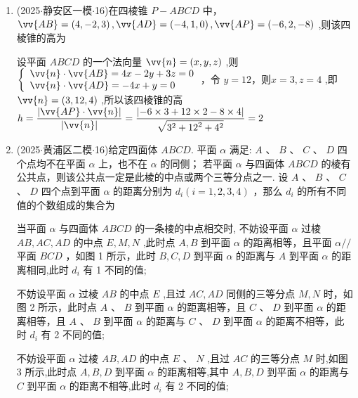 \begin{enumerate}
    \item (2025$\cdot$静安区一模$\cdot$16)在四棱锥 $P - {ABCD}$ 中， $\vv{AB} = \left( {4, - 2,3}\right) ,\vv{AD} = \left( {-4,1,0}\right) ,\vv{AP} =  \left( {-6,2, - 8}\right)$ ,则该四棱锥的高为 
    \begin{jieda}
        设平面 ${ABCD}$ 的一个法向量 $\vv{n} = \left( {x,y,z}\right)$ ,则 $\left\{\begin{array}{l} \vv{n} \cdot  \vv{AB} = {4x} - {2y} + {3z} = 0 \\  \vv{n} \cdot  \vv{AD} =  - {4x} + y = 0 \end{array}\right.$，令 $y = {12}$，则$x = 3,z = 4$ ,即 $\vv{n} = \left( {3,{12},4}\right)$ ,所以该四棱锥的高 $h = \dfrac{\left| \vv{AP} \cdot  \vv{n}\right| }{\left| \vv{n}\right| } =  \dfrac{\left| -6 \times  3 + {12} \times  2 - 8 \times  4\right| }{\sqrt{{3}^{2} + {12}^{2} + {4}^{2}}} = 2$
    \end{jieda}

    \item (2025$\cdot$黄浦区二模$\cdot$16)给定四面体 ${ABCD}$. 平面 $\alpha$ 满足:   $A$ 、 $B$ 、 $C$ 、 $D$ 四个点均不在平面 $\alpha$ 上，也不在 $\alpha$ 的同侧；   若平面 $\alpha$ 与四面体 ${ABCD}$ 的棱有公共点，则该公共点一定是此棱的中点或两个三等分点之一. 设 $A$ 、 $B$ 、 $C$ 、 $D$ 四个点到平面 $\alpha$ 的距离分别为 ${d}_{i}\left( {i = 1,2,3,4}\right)$ ，那么 ${d}_{i}$ 的所有不同值的个数组成的集合为 
    \begin{jieda}
        当平面 $\alpha$ 与四面体 ${ABCD}$ 的一条棱的中点相交时, 不妨设平面 $\alpha$ 过棱 ${AB},{AC},{AD}$ 的中点 $E,M,N$ ,此时点 $A,B$ 到平面 $\alpha$ 的距离相等，且平面 $\alpha //$ 平面 ${BCD}$ ，如图 1 所示，此时 $B,C,D$ 到平面 $\alpha$ 的距离与 $A$ 到平面 $\alpha$ 的距离相同,此时 ${d}_{i}$ 有 1 不同的值; 
        
        不妨设平面 $\alpha$ 过棱 ${AB}$ 的中点 $E$ ,且过 ${AC},{AD}$ 同侧的三等分点 $M,N$ 时，如图 2 所示，此时点 $A$ 、 $B$ 到平面 $\alpha$ 的距离相等，且 $C$ 、 $D$ 到平面 $\alpha$ 的距离相等，且 $A$ 、 $B$ 到平面 $\alpha$ 的距离与 $C$ 、 $D$ 到平面 $\alpha$ 的距离不相等，此时 ${d}_{i}$ 有 2 不同的值; 
        
        不妨设平面 $\alpha$ 过棱 ${AB},{AD}$ 的中点 $E$ 、 $N$ ,且过 ${AC}$ 的三等分点 $M$ 时,如图 3 所示,此时点 $A,B,D$ 到平面 $\alpha$ 的距离相等,其中 $A,B,D$ 到平面 $\alpha$ 的距离与 $C$ 到平面 $\alpha$ 的距离不相等,此时 ${d}_{i}$ 有 2 不同的值;


\end{jieda}
\end{enumerate}
